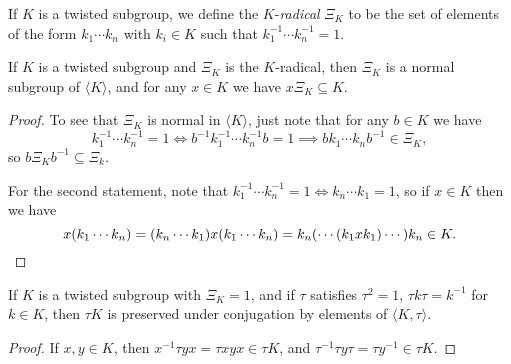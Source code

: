 \documentclass[letterpaper,11pt]{article}
\begin{document}
\begin{defn} If $K$ is a twisted subgroup, we define the $K$-\emph{radical} $\Xi_K$ to be the set of elements of the form $k_1 \cdots k_n$ with $k_i \in K$ such that $k_1^{-1}\cdots k_n^{-1} = 1$.
\end{defn}

\begin{prop} If $K$ is a twisted subgroup and $\Xi_K$ is the $K$-radical, then $\Xi_K$ is a normal subgroup of $\langle K\rangle$, and for any $x \in K$ we have $x\Xi_K \subseteq K$.
\end{prop}
\begin{proof} To see that $\Xi_K$ is normal in $\langle K\rangle$, just note that for any $b \in K$ we have
\[
k_1^{-1}\cdots k_n^{-1} = 1 \iff b^{-1}k_1^{-1}\cdots k_n^{-1}b = 1 \implies bk_1\cdots k_nb^{-1} \in \Xi_K,
\]
so $b\Xi_Kb^{-1} \subseteq \Xi_k$.

For the second statement, note that $k_1^{-1} \cdots k_n^{-1} = 1 \iff k_n\cdots k_1 = 1$, so if $x \in K$ then we have
\[
x(k_1\cdots k_n) = (k_n\cdots k_1)x(k_1\cdots k_n) = k_n(\cdots(k_1 x k_1)\cdots)k_n \in K.\qedhere
\]
\end{proof}

\begin{prop} If $K$ is a twisted subgroup with $\Xi_K = 1$, and if $\tau$ satisfies $\tau^2 = 1$, $\tau k\tau = k^{-1}$ for $k \in K$, then $\tau K$ is preserved under conjugation by elements of $\langle K,\tau\rangle$.
\end{prop}
\begin{proof} If $x,y \in K$, then $x^{-1} \tau y x = \tau xyx \in \tau K$, and $\tau^{-1} \tau y\tau = \tau y^{-1} \in \tau K$.
\end{proof}
\end{document}
